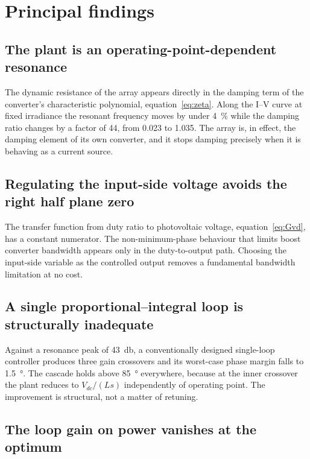 \section{Principal findings}

\subsection{The plant is an operating-point-dependent resonance}

The dynamic resistance of the array appears directly in the damping term of the
converter's characteristic polynomial, equation~\eqref{eq:zeta}. Along the I--V
curve at fixed irradiance the resonant frequency moves by under
\SI{4}{\percent} while the damping ratio changes by a factor of \num{44}, from
\num{0.023} to \num{1.035}. The array is, in effect, the damping element of its
own converter, and it stops damping precisely when it is behaving as a current
source.

\subsection{Regulating the input-side voltage avoids the right half plane zero}

The transfer function from duty ratio to photovoltaic voltage,
equation~\eqref{eq:Gvd}, has a constant numerator. The non-minimum-phase
behaviour that limits boost converter bandwidth appears only in the
duty-to-output path. Choosing the input-side variable as the controlled output
removes a fundamental bandwidth limitation at no cost.

\subsection{A single proportional--integral loop is structurally inadequate}

Against a resonance peak of \SI{43}{\decibel}, a conventionally designed
single-loop controller produces three gain crossovers and its worst-case phase
margin falls to \SI{1.5}{\degree}. The cascade holds above \SI{85}{\degree}
everywhere, because at the inner crossover the plant reduces to $V_{dc}/(Ls)$
independently of operating point. The improvement is structural, not a matter of
retuning.

\subsection{The loop gain on power vanishes at the optimum}

